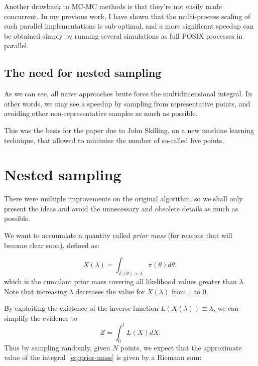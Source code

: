 \documentclass[11pt, reprint]{revtex4-2}
\begin{document}
Another drawback to MC-MC methods is that they're not easily made
concurrent.\cite{Metropolis-hastings-gibbs} In my previous work, I have
shown that the multi-process scaling of such parallel implementations is
sub-optimal, and a more significant speedup can be obtained simply by
running several simulations as full POSIX processes in parallel.\cite{me-ising}

\subsection{The need for nested sampling}\label{sec-3-3}

As we can see, all naive approaches brute force the multidimensional
integral.  In other words, we may see a speedup by sampling from
representative points, and avoiding other non-representative samples
as much as possible.

This was the basis for the paper due to John
Skilling\cite{skilling2006}, on a new machine learning technique, that
allowed to minimise the number of so-called live points.

\section{Nested sampling}\label{sec-4}

There were multiple
improvements\cite{polychord,Feroz2009MultiNestAE,Higson2018DynamicNS}
on the original algorithm, so we shall only present the ideas and
avoid the unnecessary and obsolete details as much as possible.

We want to accumulate a quantity called \emph{prior mass} (for reasons that
will become clear soon), defined as:

\begin{equation}\label{eq:prior-mass}
X ( \lambda)  = \int_{L(\theta) > \lambda} \pi (\theta) d \theta,
\end{equation}
which is the cumulant prior mass covering all likelihood values
greater than \( \lambda \). Note that increasing \( \lambda \) decreases the value
for \( X( \lambda) \) from \(1\) to \(0\).

By exploiting the existence of the inverse function
\( L ( X ( \lambda) ) \equiv \lambda \), we can simplify the evidence to
\begin{equation}
Z = \int _0 ^1 L(X) dX.
\end{equation}
Thus by sampling randomly, given \(N\) points, we expect that the
approximate value of the integral~\eqref{eq:prior-mass} is given by a
Riemann sum:
\end{document}
